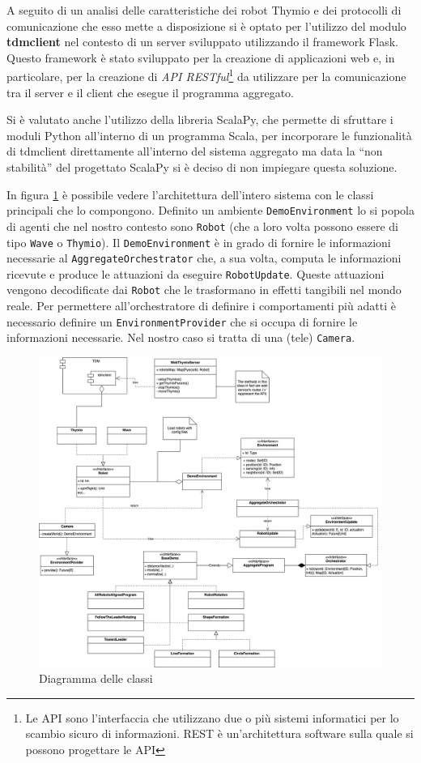 \documentclass[12pt,a4paper,openright,twoside]{book}
\begin{document}
A seguito di un analisi delle caratteristiche dei robot Thymio e dei protocolli di comunicazione che esso mette a disposizione si è optato per l'utilizzo del modulo \textbf{tdmclient} nel contesto di un server sviluppato utilizzando il framework Flask. Questo framework è stato sviluppato per la creazione di applicazioni web e, in particolare, per la creazione di \textit{API RESTful}\footnote{Le API sono l'interfaccia che utilizzano due o più sistemi informatici per lo scambio sicuro di informazioni. REST è un'architettura software sulla quale si possono progettare le API} da utilizzare per la comunicazione tra il server e il client che esegue il programma aggregato. 

Si è valutato anche l'utilizzo della libreria ScalaPy, che permette di sfruttare i moduli Python all'interno di un programma Scala, per incorporare le funzionalità di tdmclient direttamente all'interno del sistema aggregato ma data la ``non stabilità'' del progettato ScalaPy si è deciso di non impiegare questa soluzione.

In figura \ref{fig:classi} è possibile vedere l'architettura dell'intero sistema con le classi principali che lo compongono. Definito un ambiente \verb|DemoEnvironment| lo si popola di agenti che nel nostro contesto sono \verb|Robot| (che a loro volta possono essere di tipo \verb|Wave| o \verb|Thymio|). Il \verb|DemoEnvironment| è in grado di fornire le informazioni necessarie al \verb|AggregateOrchestrator| che, a sua volta, computa le informazioni ricevute e produce le attuazioni da eseguire \verb|RobotUpdate|. Queste attuazioni vengono decodificate dai \verb|Robot| che le trasformano in effetti tangibili nel mondo reale. Per permettere all'orchestratore di definire i comportamenti più adatti è necessario definire un \verb|EnvironmentProvider| che si occupa di fornire le informazioni necessarie. Nel nostro caso si tratta di una (tele) \verb|Camera|.

\begin{figure}
    \centering
    \includegraphics[width=.99\linewidth]{figures/classi.jpg}
    \caption{Diagramma delle classi}
    \label{fig:classi}
\end{figure}
\end{document}
